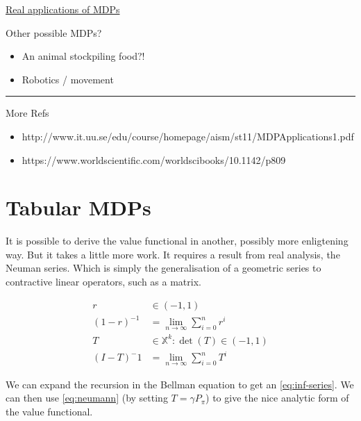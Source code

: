 \href{http://www.it.uu.se/edu/course/homepage/aism/st11/MDPApplications1.pdf}{Real
applications of MDPs}

Other possible MDPs?

\begin{itemize}
\tightlist
\item
  An animal stockpiling food?!
\item
  Robotics / movement
\end{itemize}

\begin{center}\rule{0.5\linewidth}{\linethickness}\end{center}

More Refs

\begin{itemize}
\tightlist
\item
  http://www.it.uu.se/edu/course/homepage/aism/st11/MDPApplications1.pdf
\item
  https://www.worldscientific.com/worldscibooks/10.1142/p809
\end{itemize}

\section{Tabular MDPs}\label{vf-neumann}

It is possible to derive the value functional in another, possibly more enligtening way. But it takes a little more work. It requires a result from real analysis, the Neuman series. Which is simply the generalisation of a geometric series to contractive linear operators, such as a matrix.

\begin{align*}
r &\in (-1, 1) \\
(1-r)^{-1} &= \lim_{n\to \infty} \sum_{i=0}^n r^i \tag{Geometric series}\\
T &\in \mathbb X^k: \det(T) \in (-1, 1) \\
(I-T)^-1 &= \lim_{n\to \infty} \sum_{i=0}^n T^i \label{eq:neumann}\tag{Neumann series}
\end{align*}

We can expand the recursion in the Bellman equation to get an \eqref{eq:inf-series}. We can then use \eqref{eq:neumann} (by setting $T=\gamma P_{\pi}$) to give the nice analytic form of the value functional.

